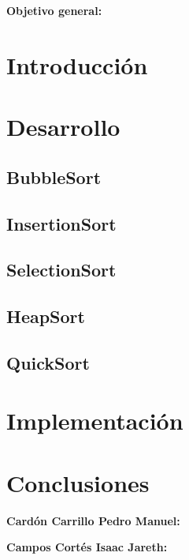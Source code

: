 \documentclass[letterpaper,12pt]{article}
\begin{document}
	
	\begin{titlepage}
		\begin{flushleft}
			\vspace*{.5cm}
			\Large\textbf{Objetivo general:}\\
			\vspace{1.5cm}
		\end{flushleft}
	\end{titlepage}
	
	\section*{Introducción}
	
	\section*{Desarrollo}
	
	\subsection{BubbleSort}
	\subsection{InsertionSort}
	\subsection{SelectionSort}
	\subsection{HeapSort}
	\subsection{QuickSort}
	
	\section*{Implementación}
	
	\section*{Conclusiones}
	
	
	\textbf{Cardón Carrillo Pedro Manuel:}
	
	\textbf{Campos Cortés Isaac Jareth:}
	
	
\end{document}
